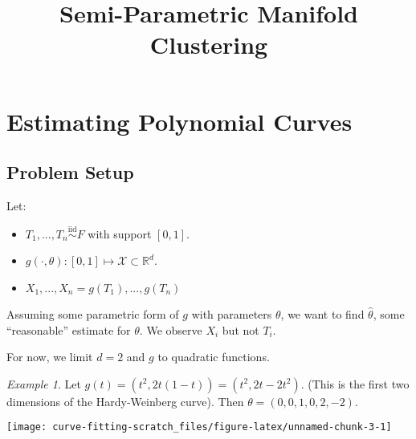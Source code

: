 \documentclass[
  11pt,
]{article}
\title{Semi-Parametric Manifold Clustering}
\author{}
\date{\vspace{-2.5em}}
\providecommand{\tightlist}{%
  \setlength{\itemsep}{0pt}\setlength{\parskip}{0pt}}
\begin{document}
\maketitle

\newcommand{\diag}{\mathrm{diag}}
\newcommand{\tr}{\mathrm{Tr}}
\newcommand{\blockdiag}{\mathrm{blockdiag}}
\newcommand{\indep}{\stackrel{\mathrm{ind}}{\sim}}
\newcommand{\iid}{\stackrel{\mathrm{iid}}{\sim}}
\newcommand{\Bernoulli}{\mathrm{Bernoulli}}
\newcommand{\Betadist}{\mathrm{Beta}}
\newcommand{\Uniform}{\mathrm{Uniform}}
\newcommand{\BG}{\mathrm{BernoulliGraph}}
\newcommand{\Categorical}{\mathrm{Categorical}}
\newcommand{\Multinomial}{\mathrm{Multinomial}}
\newcommand{\RDPG}{\mathrm{RDPG}}
\newcommand{\GRDPG}{\mathrm{GRDPG}}
\newtheorem{definition}{Definition}
\newtheorem{theorem}{Theorem}
\newtheorem{lemma}{Lemma}
\theoremstyle{remark}
\newtheorem*{remark}{Remark}
\theoremstyle{example}
\newtheorem{example}{Example}
\newcommand{\dd}{\mathrm{d}}
\newcommand{\as}{\stackrel{\mathrm{a.s.}}{\to}}

\hypertarget{estimating-polynomial-curves}{%
\section{Estimating Polynomial
Curves}\label{estimating-polynomial-curves}}

\hypertarget{problem-setup}{%
\subsection{Problem Setup}\label{problem-setup}}

Let:

\begin{itemize}
\tightlist
\item
  \(T_1, ..., T_n \stackrel{\mathrm{iid}}{\sim}F\) with support
  \([0, 1]\).
\item
  \(g(\cdot, \theta) : [0, 1] \mapsto \mathcal{X} \subset \mathbb{R}^d\).
\item
  \(X_1, ..., X_n = g(T_1), ..., g(T_n)\)
\end{itemize}

Assuming some parametric form of \(g\) with parameters \(\theta\), we
want to find \(\hat{\theta}\), some ``reasonable'' estimate for
\(\theta\). We observe \(X_i\) but not \(T_i\).

For now, we limit \(d = 2\) and \(g\) to quadratic functions.

\begin{example}

Let $g(t) = (t^2, 2 t (1 - t) ) = (t^2, 2 t - 2 t^2)$. 
(This is the first two dimensions of the Hardy-Weinberg curve). 
Then $\theta = (0, 0, 1, 0, 2, -2)$.


\begin{center}\texttt{[image: curve-fitting-scratch\_files/figure-latex/unnamed-chunk-3-1]} \end{center}

\end{example}
\end{document}
